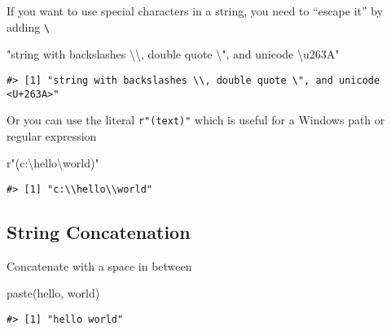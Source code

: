 \documentclass[
]{book}
\newenvironment{Shaded}{\begin{snugshade}}{\end{snugshade}}
\newcommand{\FunctionTok}[1]{\textcolor[rgb]{0.00,0.00,0.00}{#1}}
\newcommand{\NormalTok}[1]{#1}
\newcommand{\SpecialCharTok}[1]{\textcolor[rgb]{0.00,0.00,0.00}{#1}}
\newcommand{\StringTok}[1]{\textcolor[rgb]{0.31,0.60,0.02}{#1}}
\begin{document}
If you want to use special characters in a string, you need to ``escape it'' by adding \texttt{\textbackslash{}}

\begin{Shaded}
\begin{Highlighting}[]
\StringTok{"string with backslashes }\SpecialCharTok{\textbackslash{}\textbackslash{}}\StringTok{, double quote }\SpecialCharTok{\textbackslash{}"}\StringTok{, and unicode \textbackslash{}u263A"}
\end{Highlighting}
\end{Shaded}

\begin{verbatim}
#> [1] "string with backslashes \\, double quote \", and unicode <U+263A>"
\end{verbatim}

Or you can use the literal \texttt{r"(text)"} which is useful for a Windows path or regular expression

\begin{Shaded}
\begin{Highlighting}[]
\NormalTok{r}\StringTok{"(c:\textbackslash{}hello\textbackslash{}world)"}
\end{Highlighting}
\end{Shaded}

\begin{verbatim}
#> [1] "c:\\hello\\world"
\end{verbatim}

\hypertarget{string-concatenation}{%
\subsection{String Concatenation}\label{string-concatenation}}

Concatenate with a space in between

\begin{Shaded}
\begin{Highlighting}[]
\FunctionTok{paste}\NormalTok{(}\StringTok{\textquotesingle{}hello\textquotesingle{}}\NormalTok{, }\StringTok{\textquotesingle{}world\textquotesingle{}}\NormalTok{)}
\end{Highlighting}
\end{Shaded}

\begin{verbatim}
#> [1] "hello world"
\end{verbatim}
\end{document}
